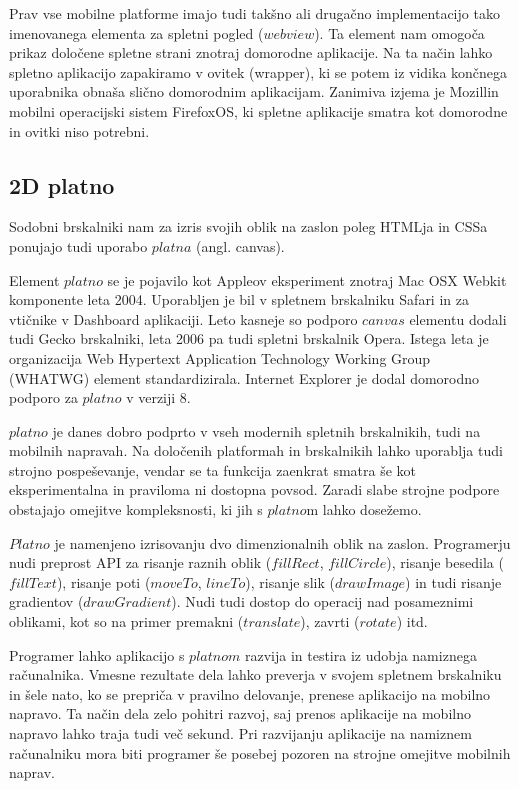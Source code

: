 Prav vse mobilne platforme imajo tudi takšno ali drugačno implementacijo tako imenovanega elementa za spletni pogled ($webview$). Ta element nam omogoča prikaz določene spletne strani znotraj domorodne aplikacije. Na ta način lahko spletno aplikacijo zapakiramo v ovitek (wrapper), ki se potem iz vidika končnega uporabnika obnaša slično domorodnim aplikacijam. Zanimiva izjema je Mozillin mobilni operacijski sistem FirefoxOS, ki spletne aplikacije smatra kot domorodne in ovitki niso potrebni.

\subsection{2D platno}
\label{sec:2dcanvas}
Sodobni brskalniki nam za izris svojih oblik na zaslon poleg HTMLja in CSSa ponujajo tudi uporabo $platna$ (angl. canvas). 

Element $platno$ se je pojavilo kot Appleov eksperiment znotraj Mac OSX Webkit komponente leta 2004. Uporabljen je bil v spletnem brskalniku Safari in za vtičnike v Dashboard aplikaciji. Leto kasneje so podporo $canvas$ elementu dodali tudi Gecko brskalniki, leta 2006 pa tudi spletni brskalnik Opera. Istega leta je organizacija Web Hypertext Application Technology Working Group (WHATWG) element standardizirala. Internet Explorer je dodal domorodno podporo za $platno$ v verziji 8.

$platno$ je danes dobro podprto v vseh modernih spletnih brskalnikih, tudi na mobilnih napravah. Na določenih platformah in brskalnikih lahko uporablja tudi strojno pospeševanje, vendar se ta funkcija zaenkrat smatra še kot eksperimentalna in praviloma ni dostopna povsod. Zaradi slabe strojne podpore obstajajo omejitve kompleksnosti, ki jih s $platno$m lahko dosežemo.


$Platno$ je namenjeno izrisovanju dvo dimenzionalnih oblik na zaslon. Programerju nudi preprost API za risanje raznih oblik ($fillRect$, $fillCircle$), risanje besedila ($fillText$), risanje poti ($moveTo$, $lineTo$), risanje slik ($drawImage$) in tudi risanje gradientov ($drawGradient$). Nudi tudi dostop do operacij nad posameznimi oblikami, kot so na primer premakni ($translate$), zavrti ($rotate$) itd. 

Programer lahko aplikacijo s $platnom$ razvija in testira iz udobja namiznega računalnika. Vmesne rezultate dela lahko preverja v svojem spletnem brskalniku in šele nato, ko se prepriča v pravilno delovanje, prenese aplikacijo na mobilno napravo. Ta način dela zelo pohitri razvoj, saj prenos aplikacije na mobilno napravo lahko traja tudi več sekund. Pri razvijanju aplikacije na namiznem računalniku mora biti programer še posebej pozoren na strojne omejitve mobilnih naprav. 

